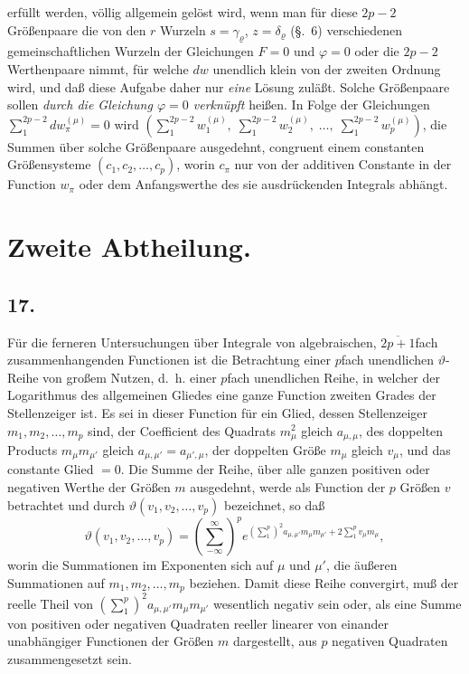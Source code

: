 \documentclass{article}
\begin{document}
erfüllt werden, völlig allgemein gelöst wird, wenn man für diese $2p-2$ Größenpaare die von den $r$ Wurzeln $s = \gamma_{\varrho}$, $z = \delta_{\varrho}$ (§.~6) verschiedenen gemeinschaftlichen Wurzeln der Gleichungen $F = 0$ und $\varphi = 0$ oder die $2p-2$ Werthenpaare nimmt, für welche $dw$ unendlich klein von der zweiten Ordnung wird, und daß diese Aufgabe daher nur \emph{eine} Lösung zuläßt. Solche Größenpaare sollen \emph{durch die Gleichung $\varphi = 0$ verknüpft} heißen. In Folge der Gleichungen $\displaystyle\sum_{1}^{2p-2} dw_{\pi}^{(\mu)} = 0$ wird $\left(\displaystyle\sum_{1}^{2p-2} w_{1}^{(\mu)}, \; \sum_{1}^{2p-2} w_{2}^{(\mu)}, \; \ldots, \; \sum_{1}^{2p-2} w_{p}^{(\mu)}\right)$, die Summen über solche Größenpaare ausgedehnt, congruent einem constanten Größensysteme $(c_{1}, c_{2}, \ldots, c_{p})$, worin $c_{\pi}$ nur von der additiven Constante in der Function $w_{\pi}$ oder dem Anfangswerthe des sie ausdrückenden Integrals abhängt.

\section*{Zweite Abtheilung.}

\subsection*{17.}

Für die ferneren Untersuchungen über Integrale von algebraischen, $\overline{2p+1}$fach zusammenhangenden Functionen ist die Betrachtung einer $p$fach unendlichen $\vartheta$-Reihe von großem Nutzen, d.~h. einer $p$fach unendlichen Reihe, in welcher der Logarithmus des allgemeinen Gliedes eine ganze Function zweiten Grades der Stellenzeiger ist. Es sei in dieser Function für ein Glied, dessen Stellenzeiger $m_{1}, m_{2}, \ldots, m_{p}$ sind, der Coefficient des Quadrats $m_{\mu}^{2}$ gleich $a_{\mu,\mu}$, des doppelten Products $m_{\mu} m_{\mu'}$ gleich $a_{\mu,\mu'} = a_{\mu',\mu}$, der doppelten Größe $m_{\mu}$ gleich $v_{\mu}$, und das constante Glied $= 0$. Die Summe der Reihe, über alle ganzen positiven oder negativen Werthe der Größen $m$ ausgedehnt, werde als Function der $p$ Größen $v$ betrachtet und durch $\vartheta(v_{1}, v_{2}, \ldots, v_{p})$ bezeichnet, so daß
\[ \vartheta(v_{1}, v_{2}, \ldots, v_{p}) = \left(\sum_{-\infty}^{\infty}\right)^{p} e^{\left(\sum_{1}^{p}\right)^{2} a_{\mu,\mu'} m_{\mu} m_{\mu'} + 2 \sum_{1}^{p} v_{\mu} m_{\mu}}, \tag{1.} \]
worin die Summationen im Exponenten sich auf $\mu$ und $\mu'$, die äußeren Summationen auf $m_{1}, m_{2}, \ldots, m_{p}$ beziehen. Damit diese Reihe convergirt, muß der reelle Theil von $\left(\displaystyle\sum_{1}^{p}\right)^{2} a_{\mu,\mu'} m_{\mu} m_{\mu'}$ wesentlich negativ sein oder, als eine Summe von positiven oder negativen Quadraten reeller linearer von einander unabhängiger Functionen der Größen $m$ dargestellt, aus $p$ negativen Quadraten zusammengesetzt sein.
\end{document}
